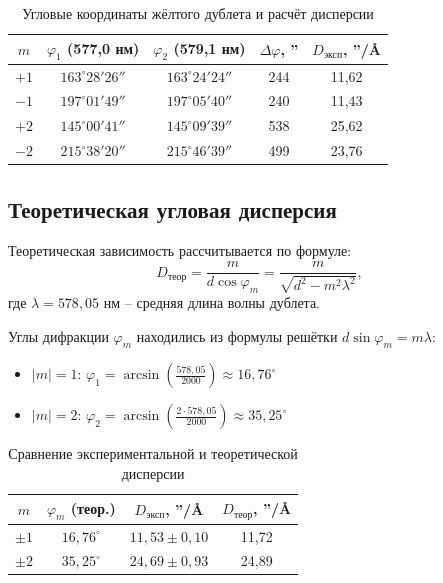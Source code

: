 \documentclass[12pt,a4paper]{article}
\begin{document}
\begin{table}[h]
\centering
\begin{tabular}{|c|c|c|c|c|}
\hline
$m$ & $\varphi_1$ (577,0 нм) & $\varphi_2$ (579,1 нм) & $\Delta\varphi$, '' & $D_{\text{эксп}}$, ''/\AA \\
\hline
$+1$ & $163^\circ 28' 26''$ & $163^\circ 24' 24''$ & 244 & 11,62 \\
\hline
$-1$ & $197^\circ 01' 49''$ & $197^\circ 05' 40''$ & 240 & 11,43 \\
\hline
$+2$ & $145^\circ 00' 41''$ & $145^\circ 09' 39''$ & 538 & 25,62 \\
\hline
$-2$ & $215^\circ 38' 20''$ & $215^\circ 46' 39''$ & 499 & 23,76 \\
\hline
\end{tabular}
\caption{Угловые координаты жёлтого дублета и расчёт дисперсии}

\end{table}

\subsection*{Теоретическая угловая дисперсия}

Теоретическая зависимость рассчитывается по формуле:
\begin{equation}
    D_{\text{теор}} = \frac{m}{d\cos\varphi_m} = \frac{m}{\sqrt{d^2 - m^2\lambda^2}},
\end{equation}
где $\lambda = 578{,}05$ нм -- средняя длина волны дублета.

Углы дифракции $\varphi_m$ находились из формулы решётки $d\sin\varphi_m = m\lambda$:
\begin{itemize}
    \item $|m| = 1$: $\varphi_1 = \arcsin\left(\frac{578{,}05}{2000}\right) \approx 16{,}76^\circ$
    \item $|m| = 2$: $\varphi_2 = \arcsin\left(\frac{2\cdot 578{,}05}{2000}\right) \approx 35{,}25^\circ$
\end{itemize}

\begin{table}[h]
\centering
\caption{Сравнение экспериментальной и теоретической дисперсии}
\begin{tabular}{|c|c|c|c|}
\hline
$m$ & $\varphi_m$ (теор.) & $D_{\text{эксп}}$, ''/\AA & $D_{\text{теор}}$, ''/\AA \\
\hline
$\pm 1$ & $16{,}76^\circ$ & $11{,}53 \pm 0{,}10$ & 11,72 \\
\hline
$\pm 2$ & $35{,}25^\circ$ & $24{,}69 \pm 0{,}93$ & 24,89 \\
\hline
\end{tabular}
\end{table}
\end{document}

